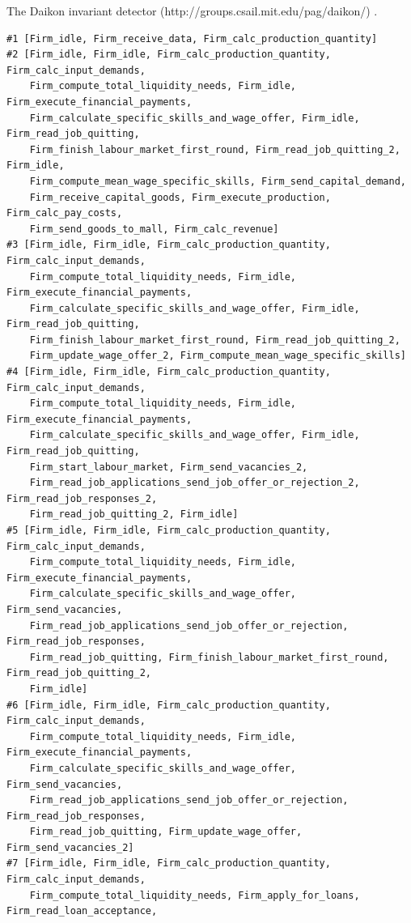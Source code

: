 The Daikon invariant detector (http://groups.csail.mit.edu/pag/daikon/)
\cite{DAIKON:2007}.

{\small
\begin{verbatim}
#1 [Firm_idle, Firm_receive_data, Firm_calc_production_quantity]
#2 [Firm_idle, Firm_idle, Firm_calc_production_quantity, Firm_calc_input_demands, 
    Firm_compute_total_liquidity_needs, Firm_idle, Firm_execute_financial_payments, 
    Firm_calculate_specific_skills_and_wage_offer, Firm_idle, Firm_read_job_quitting,
    Firm_finish_labour_market_first_round, Firm_read_job_quitting_2, Firm_idle,
    Firm_compute_mean_wage_specific_skills, Firm_send_capital_demand,
    Firm_receive_capital_goods, Firm_execute_production, Firm_calc_pay_costs,
    Firm_send_goods_to_mall, Firm_calc_revenue]
#3 [Firm_idle, Firm_idle, Firm_calc_production_quantity, Firm_calc_input_demands,
    Firm_compute_total_liquidity_needs, Firm_idle, Firm_execute_financial_payments,
    Firm_calculate_specific_skills_and_wage_offer, Firm_idle, Firm_read_job_quitting,
    Firm_finish_labour_market_first_round, Firm_read_job_quitting_2,
    Firm_update_wage_offer_2, Firm_compute_mean_wage_specific_skills]
#4 [Firm_idle, Firm_idle, Firm_calc_production_quantity, Firm_calc_input_demands,
    Firm_compute_total_liquidity_needs, Firm_idle, Firm_execute_financial_payments,
    Firm_calculate_specific_skills_and_wage_offer, Firm_idle, Firm_read_job_quitting,
    Firm_start_labour_market, Firm_send_vacancies_2,
    Firm_read_job_applications_send_job_offer_or_rejection_2, Firm_read_job_responses_2,
    Firm_read_job_quitting_2, Firm_idle]
#5 [Firm_idle, Firm_idle, Firm_calc_production_quantity, Firm_calc_input_demands,
    Firm_compute_total_liquidity_needs, Firm_idle, Firm_execute_financial_payments,
    Firm_calculate_specific_skills_and_wage_offer, Firm_send_vacancies,
    Firm_read_job_applications_send_job_offer_or_rejection, Firm_read_job_responses,
    Firm_read_job_quitting, Firm_finish_labour_market_first_round, Firm_read_job_quitting_2,
    Firm_idle]
#6 [Firm_idle, Firm_idle, Firm_calc_production_quantity, Firm_calc_input_demands,
    Firm_compute_total_liquidity_needs, Firm_idle, Firm_execute_financial_payments,
    Firm_calculate_specific_skills_and_wage_offer, Firm_send_vacancies,
    Firm_read_job_applications_send_job_offer_or_rejection, Firm_read_job_responses,
    Firm_read_job_quitting, Firm_update_wage_offer, Firm_send_vacancies_2]
#7 [Firm_idle, Firm_idle, Firm_calc_production_quantity, Firm_calc_input_demands,
    Firm_compute_total_liquidity_needs, Firm_apply_for_loans, Firm_read_loan_acceptance,

\end{verbatim}}
